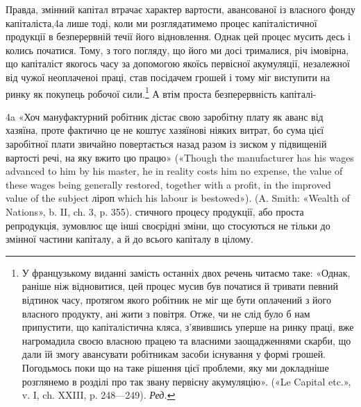 Правда, змінний капітал втрачає характер вартости, авансованої
із власного фонду капіталіста,4а лише тоді, коли ми розглядатимемо
процес капіталістичної продукції в безперервній течії
його відновлення. Однак цей процес мусить десь і колись початися.
Тому, з того погляду, що його ми досі трималися, річ
імовірна, що капіталіст якогось часу за допомогою якоїсь первісної
акумуляції, незалежної від чужої неоплаченоі праці,
став посідачем грошей і тому міг виступити на ринку як
покупець робочої сили.\footnote*{
У французькому виданні замість останніх двох речень читаємо
таке: «Однак, раніше ніж відновитися, цей процес мусив був початися
й тривати певний відтинок часу, протягом якого робітник не міг ще бути
оплачений з його власного продукту, ані жити з повітря. Отже, чи не слід
було б нам припустити, що капіталістична кляса, з’явившись уперше
на ринку праці, вже нагромадила своєю власною працею та власними
заощадженнями скарби, що дали їй змогу авансувати робітникам засоби
існування у формі грошей. Погодьмось поки що на таке рішення цієї
проблеми, яку ми докладніше розглянемо в розділі про так звану первісну
акумуляцію». («Le Capital etc.», v. I, ch. XXIII, p. 248—249). \emph{Ред.}
} А втім проста безперервність капіталі-

4a «Хоч мануфактурний робітник дістає свою заробітну плату як
аванс від хазяїна, проте фактично це не коштує хазяїнові ніяких витрат,
бо сума цієї заробітної плати звичайно повертається назад разом із зиском
у підвищеній вартості речі, на яку вжито цю працю» («Though the
manufacturer has his wages advanced to him by his master, he in reality
costs him no expense, the value of these wages being generally restored,
together with a profit, in the improved value of the subject ліроп
which his labour is bestowed»). (A. Smith: «Wealth of Nations», b. II,
ch. 3, p. 355).
стичного процесу продукції, або проста репродукція, зумовлює
ще інші своєрідні зміни, що стосуються не тільки до змінної
частини капіталу, а й до всього капіталу в цілому.


